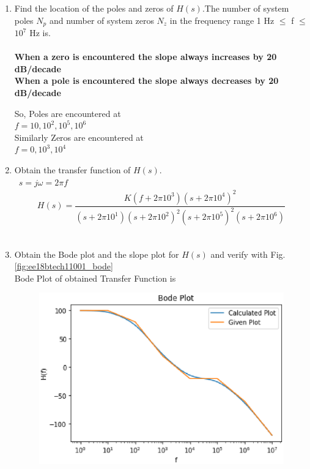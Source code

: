 \begin{enumerate}[label=\thesection.\arabic*.,ref=\thesection.\theenumi]
\item Find the location of the poles and zeros of $H(s).$The number of system poles $N_{p}$ and number of system zeros $N_{z}$ in the frequency range 1 Hz $\leq$ f $\leq$ $10^{7}$ Hz is.
\\
\solution\\
\textbf{When a zero is encountered the slope always increases by 20 dB/decade}\\
\textbf{When a pole is encountered the slope always decreases by 20 dB/decade}

So, Poles are encountered at\\ $f = 10,10^2,10^5,10^6$\\
Similarly Zeros are encountered at\\ $f = 0,10^3,10^4$


\item Obtain the transfer function of $H(s)$.
\\
\solution\
$ s = j\omega = 2\pi f$
\begin{align}
	H(s) = \dfrac{K(f+2\pi 10^{3})(s+2\pi 10^{4})^{2}}{(s+2\pi 10^{1})(s+2\pi 10^{2})^{2}(s+2\pi 10^{5})^{2}(s+2\pi 10^{6})}
\end{align}\\


\item Obtain the Bode plot and the slope plot for $H(s)$ and verify with  Fig. \ref{fig:ee18btech11001_bode}
\\
\solution
Bode Plot of obtained Transfer Function is 
\begin{figure}[htp]
    \centering
    \includegraphics[width=\columnwidth]{./figs/ee18btech11001_2.eps}
    \caption{}
    \label{fig:bode}
\end{figure}

\end{enumerate}
